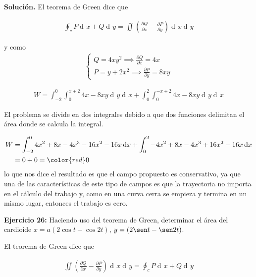 \documentclass[12pt]{article}
\DeclareMathOperator{\di}{d\!}
\begin{document}
\vspace{5mm}

\noindent \textbf{Solución.}
\vspace{3mm}
El teorema de Green dice que 

\begin{align*}
	\oint_c P \di x + Q \di y = \iint \left( \frac{\partial Q}{\partial x} 
	- \frac{\partial P}{\partial y} \right) \di x \di y
\end{align*}

y como 
\begin{align*}
	\begin{cases}
		Q = 4xy^2 \implies 	\frac{\partial Q}{\partial x} = 4x \\ 
		P = y + 2x^2 \implies  \frac{\partial P}{\partial y} = 8xy	
	\end{cases}
\end{align*}

\begin{align*}
	W = \int_{-2}^{0} \int_0^{x+2} 4x -8xy \di y \di x 
	+ \int_0^2 \int_0^{-x+2} 4x-8xy \di y \di x
\end{align*}

El problema se divide en dos integrales debido a que dos funciones delimitan el área donde
se calcula la integral.

\begin{align*}
	W &= \int_{-2}^0 4x^2 + 8x - 4x^3 - 16x^2 -16x \di x + \int_0^2 -4x^2 + 8x -4 x^3 + 16x^2
	- 16x \di x \\
	& = 0 + 0 = \color{red} 0
\end{align*}
lo que nos dice el resultado es que el campo propuesto es conservativo, ya que una de las 
características de este tipo de campos es que la trayectoria no importa en el cálculo del
trabajo y, como en una curva cerra se empieza y termina en un mismo lugar, entonces
el trabajo es cero.

\vspace{5mm}

\noindent \textbf{Ejercicio 26:} Haciendo uso del teorema de Green, determinar el área del 
cardioide $x = a(2\cos t - \cos 2t)$, $y = (2\sen t - \sen 2t)$.
\vspace{5mm}

\vspace{3mm}
El teorema de Green dice que 

\begin{align*}
	\iint \left( \frac{\partial Q}{\partial x} 
	- \frac{\partial P}{\partial y} \right) \di x \di y =
	\oint_c P \di x + Q \di y  
\end{align*}
\end{document}
